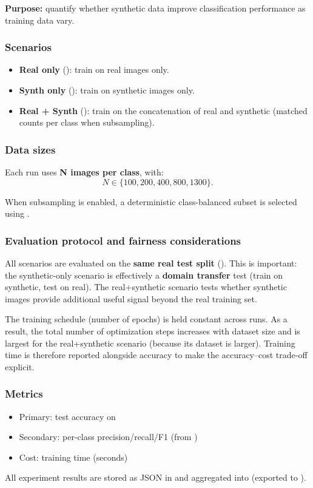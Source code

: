 \textbf{Purpose:} quantify whether synthetic data improve classification performance as training data vary.

\subsubsection{Scenarios}

\begin{itemize}
\item \textbf{Real only} (): train on real images only.
\item \textbf{Synth only} (): train on synthetic images only.
\item \textbf{Real + Synth} (): train on the concatenation of real and synthetic (matched counts per class when subsampling).
\end{itemize}

\subsubsection{Data sizes}

Each run uses \textbf{N images per class}, with:
\[
N \in \{100, 200, 400, 800, 1300\}.
\]

When subsampling is enabled, a deterministic class-balanced subset is selected using .

\subsubsection{Evaluation protocol and fairness considerations}

All scenarios are evaluated on the \textbf{same real test split} (). This is important: the synthetic-only scenario is effectively a \textbf{domain transfer} test (train on synthetic, test on real). The real+synthetic scenario tests whether synthetic images provide additional useful signal beyond the real training set.

The training schedule (number of epochs) is held constant across runs. As a result, the total number of optimization steps increases with dataset size and is largest for the real+synthetic scenario (because its dataset is larger). Training time is therefore reported alongside accuracy to make the accuracy--cost trade-off explicit.

\subsubsection{Metrics}

\begin{itemize}
\item Primary: test accuracy on 
\item Secondary: per-class precision/recall/F1 (from )
\item Cost: training time (seconds)
\end{itemize}

All experiment results are stored as JSON in  and aggregated into  (exported to ).
